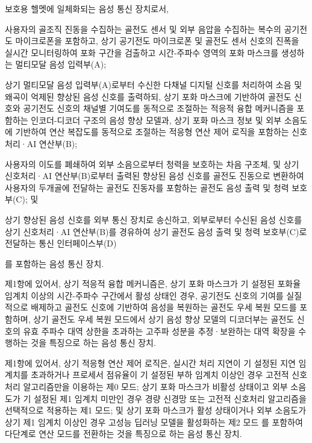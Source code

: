 \documentclass{article}
\begin{document}
\begin{enumerate}[label=\textbf{[\arabic*]}]


    \item 보호용 헬멧에 일체화되는 음성 통신 장치로서,

    사용자의 골조직 진동을 수집하는 골전도 센서 및 외부 음압을 수집하는 복수의 공기전도 마이크로폰을 포함하고, 상기 공기전도 마이크로폰 및 골전도 센서 신호의 진폭을 실시간 모니터링하여 포화 구간을 검출하고 시간-주파수 영역의 포화 마스크를 생성하는 멀티모달 음성 입력부(A);

    상기 멀티모달 음성 입력부(A)로부터 수신한 다채널 디지털 신호를 처리하여 소음 및 왜곡이 억제된 향상된 음성 신호를 출력하되, 상기 포화 마스크에 기반하여 골전도 신호와 공기전도 신호의 채널별 기여도를 동적으로 조절하는 적응적 융합 메커니즘을 포함하는 인코더-디코더 구조의 음성 향상 모델과, 상기 포화 마스크 정보 및 외부 소음도에 기반하여 연산 복잡도를 동적으로 조절하는 적응형 연산 제어 로직을 포함하는 신호처리·AI 연산부(B);

    사용자의 이도를 폐쇄하여 외부 소음으로부터 청력을 보호하는 차음 구조체, 및 상기 신호처리·AI 연산부(B)로부터 출력된 향상된 음성 신호를 골전도 진동으로 변환하여 사용자의 두개골에 전달하는 골전도 진동자를 포함하는 골전도 음성 출력 및 청력 보호부(C); 및

    상기 향상된 음성 신호를 외부 통신 장치로 송신하고, 외부로부터 수신된 음성 신호를 상기 신호처리·AI 연산부(B)를 경유하여 상기 골전도 음성 출력 및 청력 보호부(C)로 전달하는 통신 인터페이스부(D)

    를 포함하는 음성 통신 장치.


    \item 제1항에 있어서,
    상기 적응적 융합 메커니즘은, 상기 포화 마스크가 기 설정된 포화율 임계치 이상의 시간-주파수 구간에서 활성 상태인 경우, 공기전도 신호의 기여를 실질적으로 배제하고 골전도 신호에 기반하여 음성을 복원하는 골전도 우세 복원 모드를 포함하며,
    상기 골전도 우세 복원 모드에서 상기 음성 향상 모델의 디코더부는 골전도 신호의 유효 주파수 대역 상한을 초과하는 고주파 성분을 추정·보완하는 대역 확장을 수행하는 것을 특징으로 하는 음성 통신 장치.

    \item 제1항에 있어서,
    상기 적응형 연산 제어 로직은,
    실시간 처리 지연이 기 설정된 지연 임계치를 초과하거나 프로세서 점유율이 기 설정된 부하 임계치 이상인 경우 고전적 신호처리 알고리즘만을 이용하는 제0 모드;
    상기 포화 마스크가 비활성 상태이고 외부 소음도가 기 설정된 제1 임계치 미만인 경우 경량 신경망 또는 고전적 신호처리 알고리즘을 선택적으로 적용하는 제1 모드; 및
    상기 포화 마스크가 활성 상태이거나 외부 소음도가 상기 제1 임계치 이상인 경우 고성능 딥러닝 모델을 활성화하는 제2 모드
    를 포함하여 다단계로 연산 모드를 전환하는 것을 특징으로 하는 음성 통신 장치.


\end{enumerate}
\end{document}
